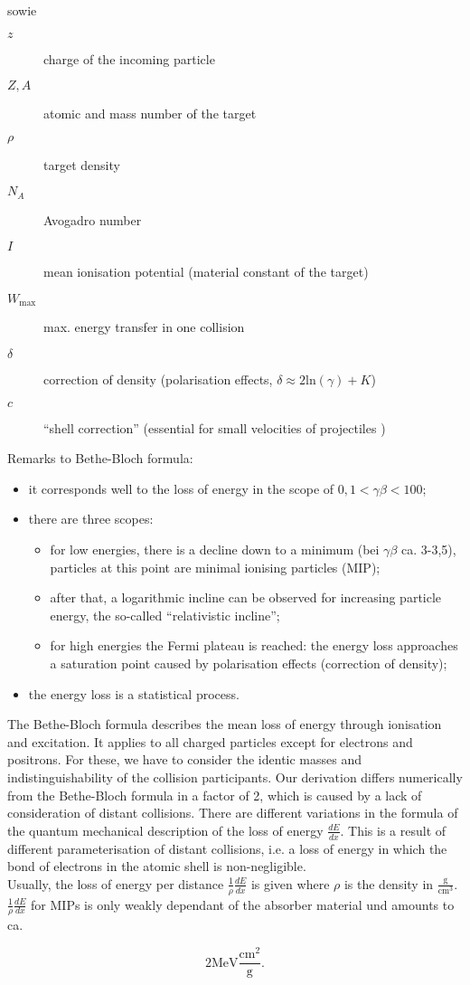 sowie
\begin{description}
\item[$z$]charge of the incoming particle
\item[$Z, A$] atomic and mass number of the target
\item[$\rho$] target density
\item[$N_A$] Avogadro number
\item[$I$] mean ionisation potential (material constant of the target)
\item[$W_{\text{max}}$] max. energy transfer in one collision
\item[$\delta$] correction of density (polarisation effects, $\delta \approx 2\text{ln}(\gamma)+K$)
\item[$c$] ``shell correction'' (essential for small velocities of projectiles )
\end{description}

Remarks to Bethe-Bloch formula:

\begin{itemize}
  \item it corresponds well to the loss of energy in the scope of $0,1 < \gamma\beta < 100$;
  \item there are three scopes:
  			\begin{itemize}
  			  \item for low energies, there is a decline down to a minimum (bei $\gamma\beta$
  			  ca. 3-3,5), particles at this point are minimal ionising particles (MIP);
  			  \item after that, a logarithmic incline can be observed for increasing particle energy, the
  			  so-called ``relativistic incline'';
  			  \item for high energies the Fermi plateau is reached: the energy loss approaches a
  			  saturation point caused by polarisation effects (correction of density);
  			  \end{itemize}
  \item the energy loss is a statistical process.
\end{itemize}

The Bethe-Bloch formula describes the mean loss of energy through ionisation and excitation. It
applies to all charged particles except for electrons and positrons. For these, we have to consider
the identic masses and indistinguishability of the collision participants. Our derivation differs
numerically from the Bethe-Bloch formula in a factor of 2, which is caused by a lack of
consideration of distant collisions. There are different variations in the formula of the quantum
mechanical description of the loss of energy $\frac{dE}{dx}$. This is a result of different 
parameterisation of distant collisions, i.e. a loss of energy in which the bond of electrons in the
atomic shell is non-negligible.
\\
Usually, the loss of energy per distance $\frac{1}{\rho}\frac{dE}{dx}$ is given where $\rho$ is the
density in $\frac{\text{g}}{\text{cm}^3}$. $\frac{1}{\rho}\frac{dE}{dx}$ for MIPs is only weakly
dependant of the absorber material und amounts to ca.

\[2 \text{MeV}\frac{\text{cm}^2}{\text{g}}.\]
